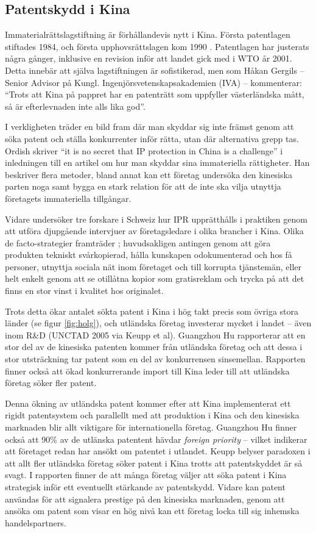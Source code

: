 
\subsection{Patentskydd i Kina}

Immaterialrättslagstiftning är förhållandevis nytt i Kina. Första patentlagen stiftades 1984, och första upphovsrättslagen kom 1990 \cite{gergils}. Patentlagen har justerats några gånger, inklusive en revision inför att landet gick med i WTO år 2001. Detta innebär att själva lagstiftningen är sofistikerad, men som Håkan Gergils -- Senior Advisor på Kungl. Ingenjörsvetenskapsakademien (IVA) -- kommenterar: ``Trots att Kina på pappret har en patenträtt som uppfyller västerländska mått, så är 
efterlevnaden inte alls lika god''.

I verkligheten träder en bild fram där man skyddar sig inte främst genom att söka patent och ställa konkurrenter inför rätta, utan där alternativa grepp tas. Ordish skriver ``it is no secret that IP protection in China is a challenge'' \cite{ordish} i inledningen till en artikel om hur man skyddar sina immateriella rättigheter. Han beskriver flera metoder, bland annat kan ett företag undersöka den kinesiska parten noga samt bygga en stark relation för att de inte ska vilja utnyttja företagets immateriella tillgångar.

Vidare undersöker tre forskare i Schweiz hur IPR upprätthålls i praktiken genom att utföra djupgående intervjuer av företagsledare i olika brancher i Kina. Olika de facto-strategier framträder \cite{keupp}; huvudsakligen antingen genom att göra produkten tekniskt svårkopierad, hålla kunskapen odokumenterad och hos få personer, utnyttja sociala nät inom företaget och till korrupta tjänstemän, eller helt enkelt genom att se otillåtna kopior som gratisreklam och trycka på att det finns en stor vinst i kvalitet hos originalet.

Trots detta ökar antalet sökta patent i Kina i hög takt precis som övriga stora länder (se figur \ref{fig:holg}), och utländska företag investerar mycket i landet -- även inom R\&D (UNCTAD 2005 via Keupp et al). Guangzhou Hu rapporterar att en stor del av de kinesiska patenten kommer från utländska företag och att dessa i stor utsträckning tar patent som en del av konkurrensen sinsemellan\cite{hu}. Rapporten finner också att ökad konkurrerande import till Kina leder till att utländska företag söker fler patent.

Denna ökning av utländska patent kommer efter att Kina implementerat ett rigidt patentsystem och parallellt med att produktion i Kina och den kinesiska marknaden blir allt viktigare för internationella företag. Guangzhou Hu finner också att 90\% av de utlänska patentent hävdar \emph{foreign priority} -- vilket indikerar att företaget redan har ansökt om patentet i utlandet\cite{hu}. Keupp belyser paradoxen i att allt fler utländska företag söker patent i Kina trotts att patentskyddet är så svagt\cite{keupp2}. I rapporten finner de att många företag väljer att söka patent i Kina strategisk inför ett eventuellt stärkande av patentskydd\cite{keupp2}. Vidare kan patent användas för att signalera prestige på den kinesiska marknaden, genom att ansöka om patent som visar en hög nivå kan ett företag locka till sig inhemska handelspartners\cite{keupp2}.
